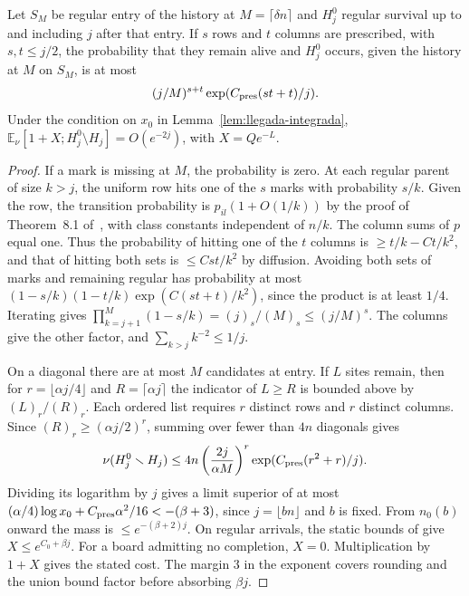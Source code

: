 \begin{lema}\label{lem:prescripcion-larga}
Let \(S_M\) be regular entry of the history at \(M=\lceil\delta n\rceil\) and \(H^0_j\) regular survival
up to and including \(j\) after that entry. If \(s\) rows and \(t\) columns are prescribed, with \(s,t\le
j/2\), the probability that they remain alive and \(H_j^0\) occurs, given the history at \(M\) on
\(S_M\), is at most
\[
 (j/M)^{s+t}\exp(C_{\rm pres}(st+t)/j).
\]
Under the condition on \(x_0\) in Lemma~\ref{lem:llegada-integrada}, \(\mathbb E_\nu[1+X;H^0_j\setminus
H_j]=O(e^{-2j})\), with \(X=Qe^{-L}\).
\end{lema}
\begin{proof}
If a mark is missing at \(M\), the probability is zero. At each regular parent of size \(k>j\), the
uniform row hits one of the \(s\) marks with probability \(s/k\). Given the row, the transition
probability is \(p_{il}(1+O(1/k))\) by the proof of Theorem~8.1 of~\cite{pc}, with class constants
independent of \(n/k\). The column sums of \(p\) equal one. Thus the probability of hitting one of the
\(t\) columns is \(\ge t/k-Ct/k^2\), and that of hitting both sets is \(\le Cst/k^2\) by diffusion.
Avoiding both sets of marks and remaining regular has probability at most
\((1-s/k)(1-t/k)\exp(C(st+t)/k^2)\), since the product is at least \(1/4\). Iterating gives
\(\prod_{k=j+1}^M(1-s/k)=(j)_s/(M)_s\le(j/M)^s\). The columns give the other factor, and
\(\sum_{k>j}k^{-2}\le1/j\).

On a diagonal there are at most \(M\) candidates at entry. If \(L\) sites remain, then for
\(r=\lfloor\alpha j/4\rfloor\) and \(R=\lceil\alpha j\rceil\) the indicator of \(L\ge R\) is bounded
above by \((L)_r/(R)_r\). Each ordered list requires \(r\) distinct rows and \(r\) distinct columns.
Since \((R)_r\ge(\alpha j/2)^r\), summing over fewer than \(4n\) diagonals gives
\[
 \nu(H^0_j\setminus H_j)\le
 4n\left(\frac{2j}{\alpha M}\right)^r
      \exp(C_{\rm pres}(r^2+r)/j).
\]
Dividing its logarithm by \(j\) gives a limit superior of at most \((\alpha/4)\log x_0+C_{\rm
pres}\alpha^2/16<-(\beta+3)\), since \(j=\lfloor bn\rfloor\) and \(b\) is fixed. From \(n_0(b)\) onward
the mass is \(\le e^{-(\beta+2)j}\). On regular arrivals, the static bounds of \cite[6.5--6.8]{tc} give
\(X\le e^{C_0+\beta j}\). For a board admitting no completion, \(X=0\). Multiplication by \(1+X\) gives
the stated cost. The margin \(3\) in the exponent covers rounding and the union bound factor before
absorbing \(\beta j\).
\end{proof}
